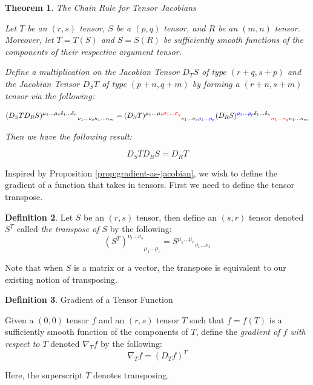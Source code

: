 \documentclass[a4paper]{article}
\theoremstyle{plain} %
\newtheorem{theorem}{Theorem}[section]
\theoremstyle{definition} %
\newtheorem{definition}[theorem]{Definition}
\numberwithin{equation}{subsection}
\begin{document}
\begin{theorem} \label{th:tensor-chain-rule}
  The Chain Rule for Tensor Jacobians

  Let $T$ be an $(r,s)$ tensor, $S$ be a $(p,q)$ tensor, and $R$ be an $(m,n)$ tensor. Moreover, let 
  $T = T(S)$ and $S = S(R)$ be sufficiently smooth functions of the components of their respective argument tensor.

  Define a multiplication on the Jacobian Tensor $D_T S$ of type $(r+q,s+p)$ and the Jacobian Tensor $D_S T$ of type $(p+n,q+m)$ by forming 
  a $(r+n,s+m)$ tensor via the following:

  \[ {(D_S T D_R S)^{\mu_1 \dots \mu_r  \delta_1 \dots \delta_n }}_{\nu_1 \dots \nu_s \kappa_1 \dots \kappa_m} = 
  {(D_S T)^{\mu_1 \dots \mu_r \textcolor{red}{\sigma_1 \dots \sigma_q }}}_{\nu_1 \dots \nu_s \textcolor{blue}{\rho_1 \dots \rho_p}} 
  {(D_R S)^{\textcolor{blue}{\rho_1 \dots \rho_p} \delta_1 \dots \delta_n }}_{ \textcolor{red}{\sigma_1 \dots \sigma_q } \kappa_1 \dots \kappa_m} \]

  Then we have the following result:

  \[ D_S T D_R S = D_R T\]
\end{theorem}

Inspired by Proposition \ref{prop:gradient-as-jacobian}, we wish to define the gradient of a function that takes in tensors.
First we need to define the tensor transpose.
\begin{definition} \label{def:transpose-tensor}
  Let $S$ be an $(r,s)$ tensor, then define an $(s,r)$ tensor denoted $S^T$ called \emph{the transpose of $S$} by the following:
  \[{(S^T)^{\nu_1 \dots \nu_s}}_{\mu_1 \dots \mu_r} = {S^{\mu_1 \dots \mu_r}}_{\nu_1 \dots \nu_s}\]
  
\end{definition}
Note that when $S$ is a matrix or a vector, the transpose is equivalent to our existing notion of transposing.

\begin{definition} \label{def:gradient-as-tensor-jacobian}
  Gradient of a Tensor Function

  Given a $(0,0)$ tensor $f$ and an $(r,s)$ tensor $T$ such that $f = f(T)$ is a sufficiently smooth function of the components of $T$,
  define the \emph{gradient of $f$ with respect to $T$} denoted $\nabla_T f$ by the following:
  \[ \nabla_T f = (D_T f)^T\]

  Here, the superscript $T$ denotes transposing.
\end{definition}
\end{document}
